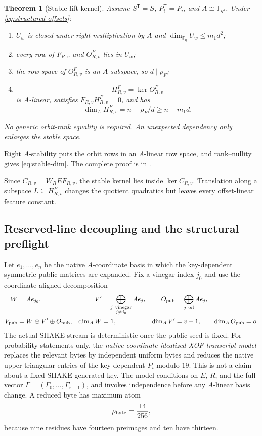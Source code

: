 \documentclass[11pt]{article}
\newtheorem{theorem}{Theorem}[section]
\newcommand{\F}{\mathbb F}
\newcommand{\transpose}{\mathsf T}
\begin{document}
\begin{theorem}[Stable-lift kernel]\label{thm:stable-kernel}
Assume $S^\transpose=S$, $P_i^\transpose=P_i$, and $A\cong\F_{q^d}$.  Under
\eqref{eq:structured-offsets}:
\begin{enumerate}[label=(\roman*)]
\item $U_w$ is closed under right multiplication by $A$ and
      $\dim_{\F_q}U_w\le m_1d^2$;
\item every row of $F_{R,v}$ and $O^F_{R,v}$ lies in $U_w$;
\item the row space of $O^F_{R,v}$ is an $A$-subspace, so $d\mid\rho_F$;
\item
\[
 H^F_{R,v}=\ker O^F_{R,v}
\]
is $A$-linear, satisfies $F_{R,v}H^F_{R,v}=0$, and has
\begin{equation}
  \dim_A H^F_{R,v}=n-\rho_F/d\ge n-m_1d.             \label{eq:stable-dim}
\end{equation}
\end{enumerate}
No generic orbit-rank equality is required.  An unexpected dependency only
enlarges the stable space.
\end{theorem}

Right $A$-stability puts the orbit rows in an $A$-linear row space, and
rank--nullity gives \eqref{eq:stable-dim}.  The complete proof is in
.

Since $C_{R,v}=W_REF_{R,v}$, the stable kernel lies inside
$\ker C_{R,v}$.  Translation along a subspace $L\subseteq H^F_{R,v}$ changes
the quotient quadratics but leaves every offset-linear feature constant.

\subsection{Reserved-line decoupling and the structural preflight}
Let $e_1,\ldots,e_n$ be the native $A$-coordinate basis in which the
key-dependent symmetric public matrices are expanded.  Fix a vinegar index
$j_0$ and use the coordinate-aligned decomposition
\begin{align}
 W&=Ae_{j_0},&
 V'&=\bigoplus_{\substack{j\ {\rm vinegar}\\j\ne j_0}}Ae_j,&
 O_{\rm pub}&=\bigoplus_{j\ {\rm oil}}Ae_j,\notag\\
 V_{\rm pub}&=W\oplus V'\oplus O_{\rm pub},&
 \dim_AW&=1,&
 \dim_AV'&=v-1,\qquad \dim_AO_{\rm pub}=o.
 \label{eq:public-decomposition}
\end{align}
The actual SHAKE stream is deterministic once the public seed is fixed.  For
probability statements only, the \emph{native-coordinate idealized
XOF-transcript model} replaces the relevant bytes by independent uniform bytes
and reduces the native upper-triangular entries of the key-dependent $P_i$
modulo $19$.  This is not a claim about a fixed SHAKE-generated key.  The model
conditions on $E$, $R$, and the full vector
$\Gamma=(\Gamma_0,\ldots,\Gamma_{r-1})$, and invokes independence before any
$A$-linear basis change.  A reduced byte has maximum atom
\[
 \rho_{\rm byte}=\frac{14}{256},
\]
because nine residues have fourteen preimages and ten have thirteen.
\end{document}
